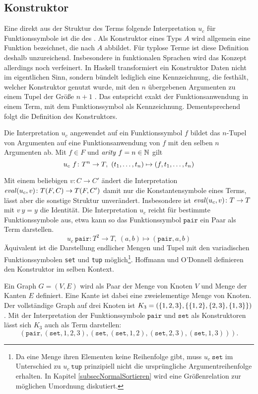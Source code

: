 \subsection{Konstruktor}
Eine direkt aus der Struktur des Terms folgende Interpretation $u_c$ für Funktionssymbole ist die des . Als Konstruktor eines Typs $A$ wird allgemein eine Funktion bezeichnet, die nach $A$ abbildet. Für typlose Terme ist diese Definition deshalb unzureichend. 
Insbesondere in funktionalen Sprachen wird das Konzept allerdings noch verfeinert. In Haskell transformiert ein Konstruktor Daten nicht im eigentlichen Sinn, sondern bündelt lediglich eine Kennzeichnung, die festhält, welcher Konstruktor genutzt wurde, mit den $n$ übergebenen Argumenten zu einem Tupel der Größe $n+1$ \cite{haskellConstructor}. Das entspricht exakt der Funktionsanwendung in einem Term, mit dem Funktionssymbol als Kennzeichnung. Dementsprechend folgt die Definition des Konstruktors.

\begin{definition}
Die Interpretation $u_c$ angewendet auf ein Funktionssymbol $f$ bildet das $n$-Tupel von Argumenten auf eine Funktionsanwendung von $f$ mit den selben $n$ Argumenten ab. 
 Mit $f \in F$ und $\Const{arity}~f = n \in \mathbb N$ 
gilt 
$$u_c~f \colon T^n \rightarrow T, ~(\tOneN) \mapsto (f, \tOneN)$$
\end{definition}

Mit einem beliebigen $v \colon C \rightarrow C'$ ändert die Interpretation {$\Const{eval}(u_c, v) \colon T(F, C) \rightarrow T(F, C')$} damit nur die Konstantensymbole eines Terms, lässt aber die sonstige Struktur unverändert. Insbesondere ist $\Const{eval}(u_c, v) \colon T \rightarrow T$ mit $v~y = y$ die Identität.
Die Interpretation $u_c$ reicht für bestimmte Funktionssymbole aus, etwa kann so das Funktionssymbol $\texttt{pair}$ ein Paar als Term darstellen.
$$u_c~\texttt{pair} \colon T^2 \rightarrow T, ~(a, b) \mapsto (\texttt{pair}, a, b)$$
Äquivalent ist die Darstellung endlicher Mengen und Tupel mit den variadischen Funktionssymbolen \texttt{set} und \texttt{tup} möglich\footnote{Da eine Menge ihren Elementen keine Reihenfolge gibt, muss $u_c~\texttt{set}$ im Unterschied zu $u_c~\texttt{tup}$ prinzipiell nicht die ursprüngliche Argumentreihenfolge erhalten. In Kapitel \ref{subsecNormalSortieren} wird eine Größenrelation zur möglichen Umordnung diskutiert.}. 
Hoffmann und O'Donnell \cite{hoffmann1982programming} definieren den Konstruktor im selben Kontext.


\begin{beispiel}
Ein Graph $G = (V, E)$ wird als Paar der Menge von Knoten $V$ und Menge der Kanten $E$ definiert. Eine Kante ist dabei eine zweielementige Menge von Knoten. Der vollständige Graph auf drei Knoten ist $K_3 = \paren*{\{1, 2, 3\}, \curl*{\{1, 2\}, \{2, 3\}, \{1, 3\}}}$. Mit der Interpretation der Funktionssymbole $\texttt{pair}$ und $\texttt{set}$ als Konstruktoren lässt sich $K_3$ auch als Term darstellen:
$$(\texttt{pair}, (\texttt{set}, 1, 2, 3), (\texttt{set}, (\texttt{set}, 1, 2), (\texttt{set}, 2, 3), (\texttt{set}, 1, 3))).$$
\end{beispiel}





